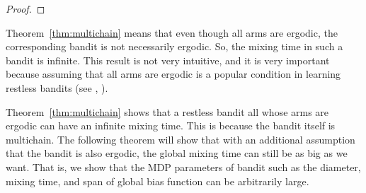 \begin{proof}

\end{proof}

Theorem~\ref{thm:multichain} means that even though all arms are ergodic, the corresponding bandit is not necessarily ergodic.
So, the mixing time in such a bandit is infinite.
This result is not very intuitive, and it is very important because assuming that all arms are ergodic is a popular condition in learning restless bandits (see \eg, \cite{ortner2012regret, jung2019thompson}).

Theorem~\ref{thm:multichain} shows that a restless bandit all whose arms are ergodic can have an infinite mixing time.
This is because the bandit itself is multichain.
The following theorem will show that with an additional assumption that the bandit is also ergodic, the global mixing time can still be as big as we want.
That is, we show that the MDP parameters of bandit such as the diameter, mixing time, and span of global bias function can be arbitrarily large.

